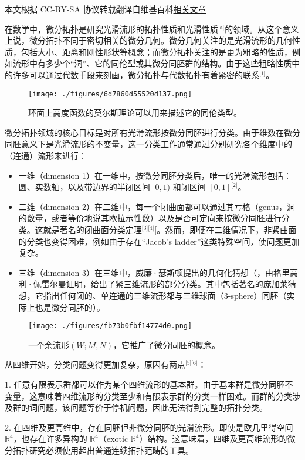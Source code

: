 
本文根据 CC-BY-SA 协议转载翻译自维基百科\href{https://en.wikipedia.org/wiki/Differential_topology}{相关文章}

在数学中，微分拓扑是研究光滑流形的拓扑性质和光滑性质\(^\text{[a]}\)的领域。从这个意义上说，微分拓扑不同于密切相关的微分几何。微分几何关注的是光滑流形的几何性质，包括大小、距离和刚性形状等概念；而微分拓扑关注的是更为粗略的性质，例如流形中有多少个“洞”、它的同伦型或其微分同胚群的结构。由于这些粗略性质中的许多可以通过代数手段来刻画，微分拓扑与代数拓扑有着紧密的联系\(^\text{[1]}\)。
\begin{figure}[ht]
\centering
\texttt{[image: ./figures/6d7860d55520d137.png]}
\caption{环面上高度函数的莫尔斯理论可以用来描述它的同伦类型。} \label{fig_WFTP_1}
\end{figure}
微分拓扑领域的核心目标是对所有光滑流形按微分同胚进行分类。由于维数在微分同胚意义下是光滑流形的不变量，这一分类工作通常通过分别研究各个维度中的（连通）流形来进行：
\begin{itemize}
\item 一维（dimension 1）在一维中，按微分同胚分类后，唯一的光滑流形包括：圆、实数轴，以及带边界的半闭区间 $[0,1)$ 和闭区间 $[0,1]$\(^\text{[2]}\)。
\item 二维（dimension 2）在二维中，每一个闭曲面都可以通过其亏格（genus，洞的数量，或者等价地说其欧拉示性数）以及是否可定向来按微分同胚进行分类。这就是著名的闭曲面分类定理\(^\text{[3][4]}\)[。然而，即便在二维情况下，非紧曲面的分类也变得困难，例如由于存在“Jacob's ladder”这类特殊空间，使问题更加复杂。
\item 三维（dimension 3）在三维中，威廉·瑟斯顿提出的几何化猜想（，由格里高利·佩雷尔曼证明，给出了紧三维流形的部分分类。其中包括著名的庞加莱猜想，它指出任何闭的、单连通的三维流形都与三维球面（3-sphere）同胚（实际上也是微分同胚的）。
\end{itemize}
\begin{figure}[ht]
\centering
\texttt{[image: ./figures/fb73b0fbf14774d0.png]}
\caption{一个余流形$(W; M, N)$，它推广了微分同胚的概念。} \label{fig_WFTP_2}
\end{figure}
从四维开始，分类问题变得更加复杂，原因有两点\(^\text{[5][6]}\)：

1. 任意有限表示群都可以作为某个四维流形的基本群。由于基本群是微分同胚不变量，这意味着四维流形的分类至少和有限表示群的分类一样困难。而群的分类涉及群的词问题，该问题等价于停机问题，因此无法得到完整的拓扑分类。

2. 在四维及更高维中，存在同胚但非微分同胚的光滑流形。即使是欧几里得空间 $\mathbb{R}^4$，也存在许多异构的 $\mathbb{R}^4$（exotic $\mathbb{R}^4$）结构。这意味着，四维及更高维流形的微分拓扑研究必须使用超出普通连续拓扑范畴的工具。


